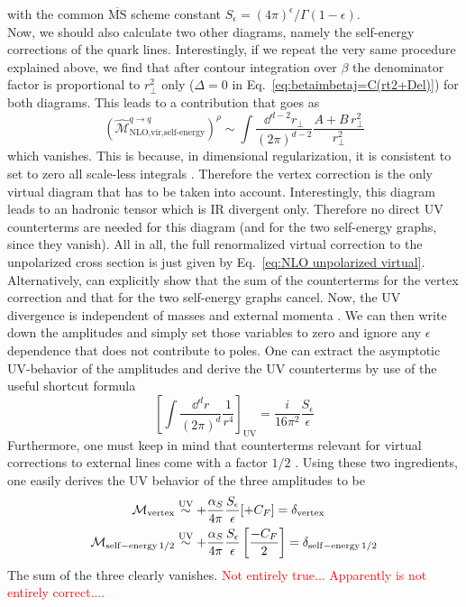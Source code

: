 with the common $\overline{\text{MS}}$ scheme constant $S_\epsilon=(4\pi)^\epsilon/\Gamma(1-\epsilon)$. \\
Now, we should also calculate two other diagrams, namely the self-energy corrections of the quark lines. Interestingly, if we repeat the very same procedure explained above, we find that after contour integration over $\beta$ the denominator factor is proportional to $r_\perp^2$ only ($\Delta=0$ in Eq.~\ref{eq:betaimbetaj=C(rt2+Del)}) for both diagrams. This leads to a contribution that goes as
\begin{equation}
     (\hat{\mathcal{M}}^{q \to q}_{\text{NLO,vir,self-energy}})^\rho\sim\int\frac{\dd^{d-2} r_\perp}{(2\pi)^{d-2}}\frac{A+B\,r_\perp^2}{r_\perp^2}
\end{equation}
which vanishes. This is because, in dimensional regularization, it is consistent to set to zero all scale-less integrals \cite{Schwartz:2014sze}. Therefore the vertex correction is the only virtual diagram that has to be taken into account. Interestingly, this diagram leads to an hadronic tensor which is IR divergent only. Therefore no direct UV counterterms are needed for this diagram (and for the two self-energy graphs, since they vanish). %
All in all, the full renormalized virtual correction to the unpolarized cross section is just given by Eq.~\ref{eq:NLO unpolarized virtual}.\\
Alternatively, can explicitly show that the sum of the counterterms for the vertex correction and that for the two self-energy graphs cancel. Now, the UV divergence is independent of masses and external momenta \cite{Collins_2011}. We can then write down the amplitudes and simply set those variables to zero and ignore any $\epsilon$ dependence that does not contribute to poles. One can extract the asymptotic UV-behavior of the amplitudes and derive the UV counterterms by use of the useful shortcut formula \cite{Schwartz:2014sze,Collins_2011}
\begin{equation}
    \left[\int \frac{\dd^d r}{(2\pi)^d}\frac{1}{r^4}\right]_{\text{UV}}=\frac{i}{16\pi^2}\frac{S_\epsilon}{\epsilon}
\end{equation}
Furthermore, one must keep in mind that counterterms relevant for virtual corrections to external lines come with a factor $1/2$ \cite{CollinsQiu89}. Using these two ingredients, one easily derives the UV behavior of the three amplitudes to be
\begin{equation}
\begin{aligned}
        \mathcal{M}_{\rm vertex}&\overset{\rm{UV}}{\sim}+\frac{\alpha_S}{4\pi}\frac{S_\epsilon}{\epsilon} [+C_F]=\delta_{\rm vertex}\\
        \mathcal{M}_{\mathrm{self-energy }\,1/2}&\overset{\rm{UV}}{\sim}+\frac{\alpha_S}{4\pi}\frac{S_\epsilon}{\epsilon}\left[\frac{-C_F}{2}\right]=\delta_{\mathrm{self-energy }\,1/2}
\end{aligned}
\end{equation}
The sum of the three clearly vanishes. \textcolor{red}{Not entirely true... Apparently \cite{Gamberg_2019} is not entirely correct....}

